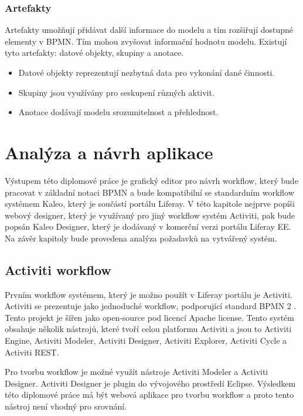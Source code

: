 \documentclass{fithesis}
\begin{document}
\subsection*{Artefakty}
Artefakty umožňují přidávat další informace do modelu a tím rozšiřují dostupné elementy v BPMN. Tím mohou zvyšovat informační hodnotu modelu. Existují tyto artefakty: datové objekty, skupiny a anotace.
\begin{itemize}
\item Datové objekty reprezentují nezbytná data pro vykonání dané činnosti.
\item Skupiny jsou využívány pro seskupení různých aktivit.
\item Anotace dodávají modelu srozumitelnost a přehlednost.
\end{itemize}



\chapter{Analýza a návrh aplikace}

Výstupem této diplomové práce je grafický editor pro návrh workflow, který bude pracovat v základní notaci BPMN a bude kompatibilní se standardním workflow systémem Kaleo, který je součástí portálu Liferay. V této kapitole nejprve popíši webový designer, který je využívaný pro jiný workflow systém Activiti, pak bude popsán Kaleo Designer, který je dodávaný v komerční verzi portálu Liferay EE. Na závěr kapitoly bude provedena analýza požadavků na vytvářený systém.

\section{Activiti workflow}
Prvním workflow systémem, který je možno použít v Liferay portálu je Activiti. Activiti se prezentuje jako jednoduché workflow, podporující standard BPMN 2 \cite{activiti}. Tento projekt je šířen jako open-source pod licencí Apache license. Tento systém obsahuje několik nástrojů, které tvoří celou platformu Activiti a jsou to Activiti Engine, Activiti Modeler, Activiti Designer, Activiti Explorer, Activiti Cycle a Activiti REST.

Pro tvorbu workflow je možné využít nástroje Activiti Modeler a Activiti Designer. Activiti Designer je plugin do vývojového prostředí Eclipse. Výsledkem této diplomové práce má být webová aplikace pro tvorbu workflow a proto tento nástroj není vhodný pro srovnání. 
\end{document}
